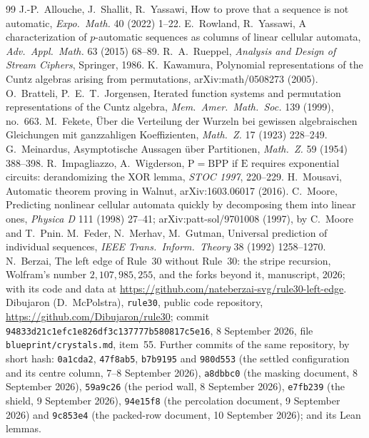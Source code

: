 \documentclass[11pt]{article}
\theoremstyle{definition}
\theoremstyle{remark}
\begin{document}
\begin{thebibliography}{99}
 J.-P.~Allouche, J.~Shallit, R.~Yassawi, How to prove that a sequence is not automatic, \emph{Expo.\ Math.} 40 (2022) 1--22.
 E.~Rowland, R.~Yassawi, A characterization of $p$-automatic sequences as columns of linear cellular automata, \emph{Adv.\ Appl.\ Math.} 63 (2015) 68--89.
 R.~A.~Rueppel, \emph{Analysis and Design of Stream Ciphers}, Springer, 1986.
 K.~Kawamura, Polynomial representations of the Cuntz algebras arising from permutations, arXiv:math/0508273 (2005).
 O.~Bratteli, P.~E.~T.~Jorgensen, Iterated function systems and permutation representations of the Cuntz algebra, \emph{Mem.\ Amer.\ Math.\ Soc.} 139 (1999), no.~663.
 M.~Fekete, \"Uber die Verteilung der Wurzeln bei gewissen algebraischen Gleichungen mit ganzzahligen Koeffizienten, \emph{Math.\ Z.} 17 (1923) 228--249.
 G.~Meinardus, Asymptotische Aussagen \"uber Partitionen, \emph{Math.\ Z.} 59 (1954) 388--398.
 R.~Impagliazzo, A.~Wigderson, $\mathrm{P}=\mathrm{BPP}$ if $\mathrm{E}$ requires exponential circuits: derandomizing the XOR lemma, \emph{STOC 1997}, 220--229.
 H.~Mousavi, Automatic theorem proving in Walnut, arXiv:1603.06017 (2016).
 C.~Moore, Predicting nonlinear cellular automata quickly by decomposing them into linear ones, \emph{Physica D} 111 (1998) 27--41; arXiv:patt-sol/9701008 (1997), by C.~Moore and T.~Pnin.
 M.~Feder, N.~Merhav, M.~Gutman, Universal prediction of individual sequences, \emph{IEEE Trans.\ Inform.\ Theory} 38 (1992) 1258--1270.
 N.~Berzai, The left edge of Rule~30 without Rule~30: the stripe recursion, Wolfram's number $2{,}107{,}985{,}255$, and the forks beyond it, manuscript, 2026; with its code and data at \url{https://github.com/nateberzai-svg/rule30-left-edge}.
 Dibujaron (D.~McPolstra), \texttt{rule30}, public code repository, \url{https://github.com/Dibujaron/rule30}; commit \texttt{94833d21c1efc1e826df}\allowbreak\texttt{3c137777b580817c5e16}, 8 September 2026, file \texttt{blueprint/crystals.md}, item~55. Further commits of the same repository, by short hash: \texttt{0a1cda2}, \texttt{47f8ab5}, \texttt{b7b9195} and \texttt{980d553} (the settled configuration and its centre column, 7--8 September 2026), \texttt{a8dbbc0} (the masking document, 8 September 2026), \texttt{59a9c26} (the period wall, 8 September 2026), \texttt{e7fb239} (the shield, 9 September 2026), \texttt{94e15f8} (the percolation document, 9 September 2026) and \texttt{9c853e4} (the packed-row document, 10 September 2026); and its Lean lemmas.

\end{thebibliography}
\end{document}
